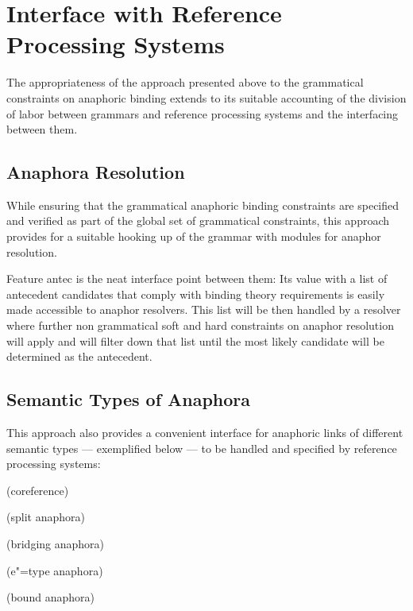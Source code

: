 \documentclass[output=paper
,modfonts
,nonflat]{langsci/langscibook}
\begin{document}
\section{Interface with Reference Processing Systems \label{discuss}}


The appropriateness of the approach presented above to the grammatical constraints on anaphoric binding
extends to its suitable accounting of the division 
of labor between grammars and reference processing systems and the interfacing between them.

\subsection{Anaphora Resolution \label{resolvers}}

While ensuring that the grammatical anaphoric binding
constraints are specified and verified as part of the global set of grammatical
constraints, this approach provides for a suitable hooking up of the grammar
with modules for anaphor resolution.

Feature {\sc antec} is the neat
interface point between them: Its value with a list of antecedent
candidates that comply with binding theory requirements
is easily made accessible to anaphor resolvers. This list will be then handled by a
resolver where further non grammatical soft and hard constraints
on anaphor resolution will apply and will filter down that list
until the most likely candidate will be determined as the antecedent.

\subsection{Semantic Types of Anaphora\label{semanticTypes}}

This approach also provides a convenient interface for anaphoric links 
of different semantic types ---  exemplified below --- to be handled
and specified by reference processing systems:

\begin{exe}
\ex

\begin{xlist}

 (coreference)
\label{anTypes}

 (split anaphora)
\label{anTypesb}

 (bridging anaphora)
\label{anTypesc}

 (e"=type anaphora)
\label{anTypesd}

 (bound anaphora)
\label{anTypese}

\end{xlist}
\end{exe}
\end{document}
